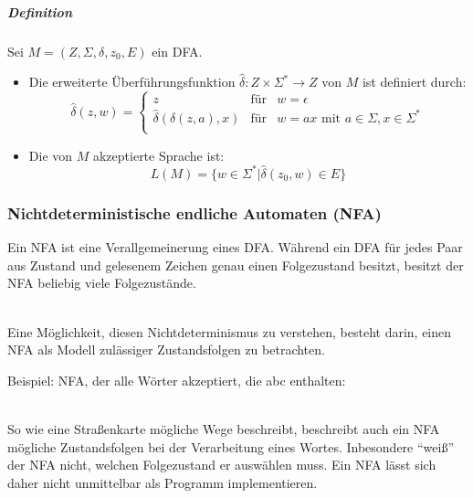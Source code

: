 \documentclass[a4paper]{scrartcl}
\begin{document}
\subparagraph{Definition} Sei $M=(Z,\Sigma,\delta,z_0,E)$ ein DFA.
\begin{itemize}
\item Die erweiterte Überführungsfunktion $\hat{\delta}: Z \times \Sigma^* \to Z$ von $M$ ist definiert durch:
\[ \hat\delta (z,w) = \left \{ \begin{array}{lcr}
z & \mbox{für} & w = \epsilon\\
\hat{\delta} (\delta(z,a),x) & \mbox{für} & w=ax \text{ mit } a \in \Sigma, x \in \Sigma^* \\
\end{array} \right.\]
\item Die von $M$ akzeptierte Sprache ist:
\[L(M) = \{ w \in \Sigma^* | \hat{\delta}(z_0,w) \in E\} \]
\end{itemize}

\subsubsection{Nichtdeterministische endliche Automaten (NFA)}
Ein NFA ist eine Verallgemeinerung eines DFA. Während ein DFA für jedes Paar aus Zustand und gelesenem Zeichen genau einen Folgezustand besitzt, besitzt der NFA beliebig viele Folgezustände.\\
\\
Eine Möglichkeit, diesen Nichtdeterminismus zu verstehen, besteht darin, einen NFA als Modell zulässiger Zustandsfolgen zu betrachten.

Beispiel: NFA, der alle Wörter akzeptiert, die abc enthalten:\\
\\
So wie eine Straßenkarte mögliche Wege beschreibt, beschreibt auch ein NFA mögliche Zustandsfolgen bei der Verarbeitung eines Wortes. Inbesondere "`weiß"' der NFA nicht, welchen Folgezustand er auswählen muss. Ein NFA lässt sich daher nicht unmittelbar als Programm implementieren.
\end{document}
